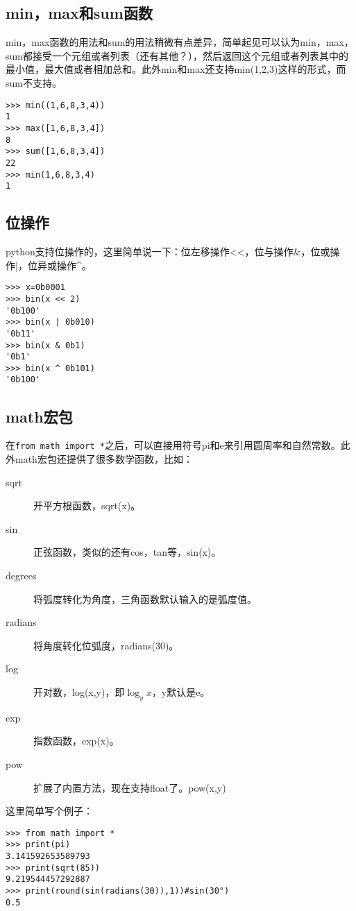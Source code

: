 \documentclass[12pt,oneside]{book}
\begin{document}
\begin{common-format}
\subsection{min，max和sum函数}
\label{sec:sum函数}
min，max函数的用法和sum的用法稍微有点差异，简单起见可以认为min，max，sum都接受一个元组或者列表（还有其他？），然后返回这个元组或者列表其中的最小值，最大值或者相加总和。此外min和max还支持min(1,2,3)这样的形式，而sum不支持。
\begin{Verbatim}
>>> min((1,6,8,3,4))
1
>>> max([1,6,8,3,4])
8
>>> sum([1,6,8,3,4])
22
>>> min(1,6,8,3,4)
1
\end{Verbatim}



\subsection{位操作}
python支持位操作的，这里简单说一下：位左移操作<<，位与操作\&{}，位或操作|，位异或操作\^{}。
\begin{Verbatim}
>>> x=0b0001
>>> bin(x << 2)
'0b100'
>>> bin(x | 0b010)
'0b11'
>>> bin(x & 0b1)
'0b1'
>>> bin(x ^ 0b101)
'0b100'
\end{Verbatim}




\subsection{math宏包}
在\verb+from math import *+之后，可以直接用符号pi和e来引用圆周率和自然常数。此外math宏包还提供了很多数学函数，比如：
\begin{description}
\item[sqrt] 开平方根函数，sqrt(x)。
\item[sin] 正弦函数，类似的还有cos，tan等，sin(x)。
\item[degrees] 将弧度转化为角度，三角函数默认输入的是弧度值。
\item[radians] 将角度转化位弧度，radians(30)。 
\item[log] 开对数，log(x,y)，即$\log_y x$，y默认是e。
\item[exp] 指数函数，exp(x)。
\item[pow] 扩展了内置方法，现在支持float了。pow(x,y)
\end{description}

这里简单写个例子：
\begin{Verbatim}
>>> from math import *
>>> print(pi)
3.141592653589793
>>> print(sqrt(85))
9.219544457292887
>>> print(round(sin(radians(30)),1))#sin(30°)
0.5
\end{Verbatim}



\end{common-format}
\end{document}
